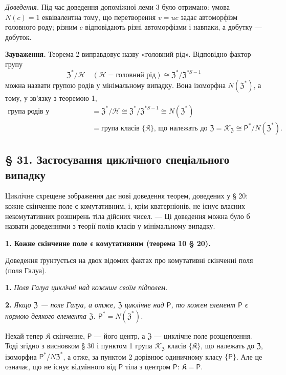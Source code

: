 \documentclass[11pt]{article}
\begin{document}
\noindent\emph{Доведення.} Під час доведення допоміжної леми 3 було отримано: умова \(N(c)=1\) еквівалентна тому, що перетворення \(v=uc\) задає автоморфізм головного роду; різним \(c\) відповідають різні автоморфізми і навпаки, а добутку --- добуток.

\noindent\textbf{Зауваження.} Теорема 2 виправдовує назву «головний рід». Відповідно фактор-групу
\[
\mathfrak Z^*/\mathscr H
\quad(\mathscr H=\text{головний рід})
\cong\mathfrak Z^*/\mathfrak Z^{*S-1}
\]
можна назвати групою родів у мінімальному випадку. Вона ізоморфна \(N(\mathfrak Z^*)\), а тому, у зв'язку з теоремою 1,
\[
\begin{aligned}
\text{група родів у мінімальному випадку}
&=\mathfrak Z^*/\mathscr H
 \cong\mathfrak Z^*/\mathfrak Z^{*S-1}
 \cong N(\mathfrak Z^*)\\
&=\text{група класів }\{\mathfrak K\}\text{, що належать до }\mathfrak Z
 =\mathscr K_{\mathfrak Z}
 \cong \mathsf{P}^*/N(\mathfrak Z^*).
\end{aligned}
\]

\subsection*{§ 31. Застосування циклічного спеціального випадку}\label{anwendungen-des-zyklischen-spezialfalles}

Циклічне схрещене зображення дає нові доведення теорем, доведених у § 20: кожне скінченне поле є комутативним, і, крім кватерніонів, не існує власних некомутативних розширень тіла дійсних чисел. --- Ці доведення можна було б назвати доведеннями з теорії полів класів у мінімальному випадку.

\noindent\textbf{1. Кожне скінченне поле є комутативним (теорема 10 § 20).}

Доведення ґрунтується на двох відомих фактах про комутативні скінченні поля (поля Галуа).

\noindent\textbf{1.} \emph{Поля Галуа циклічні над кожним своїм підполем.}

\noindent\textbf{2.} \emph{Якщо \(\mathfrak Z\) --- поле Галуа, а отже, \(\mathfrak Z\) циклічне над \(\mathsf{P}\), то кожен елемент \(\mathsf{P}\) є нормою деякого елемента \(\mathfrak Z\). \(\mathsf{P}^*=N(\mathfrak Z^*)\).}

Нехай тепер \(\mathfrak K\) скінченне, \(\mathsf{P}\) --- його центр, а \(\mathfrak Z\) --- циклічне поле розщеплення. Тоді згідно з висновком § 30 і пунктом 1 група \(\mathscr K_{\mathfrak Z}\) класів \(\{\mathfrak K\}\), що належать до \(\mathfrak Z\), ізоморфна \(\mathsf{P}^*/N\mathfrak Z^*\), а отже, за пунктом 2 дорівнює одиничному класу \(\{\mathsf{P}\}\). Але це означає, що не існує відмінного від \(\mathsf{P}\) тіла з центром \(\mathsf{P}\): \(\mathfrak K=\mathsf{P}\).
\end{document}
